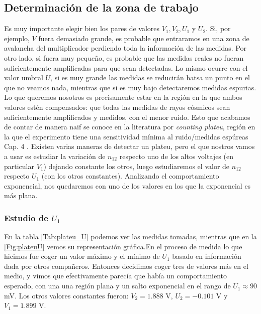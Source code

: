 \documentclass[11pt]{article}
\begin{document}
\subsection{Determinación de la zona de trabajo} \label{Subsec:zona_trabajo}

Es muy importante elegir bien los pares de valores $V_1,V_2,U_1$ y $U_2$. Si, por ejemplo, $V$ fuera demasiado grande, es probable que entraramos en una zona de avalancha del multiplicador perdiendo toda la información de las medidas. Por otro lado, si fuera muy pequeño, es probable que las medidas reales no fueran suficientemente amplificadas para que sean detectadas. Lo mismo ocurre con el valor umbral $U$, si es muy grande las medidas se reducirán hatsa un punto en el que no veamos nada, mientras que si es muy bajo detectaremos medidas espurias. Lo que queremos nosotros es precisamente estar en la región en la que ambos valores estén compensados: que todas las medidas de rayos cósmicos sean suficientemente amplificados y medidos, con el menor ruido. Esto que acabamos de contar de manera naif se conoce en la literatura por \textit{counting plateu}, región en la que el experimento tiene una sensitividad mínima al ruido/medidas espúreas Cap. 4 \cite{Knoll:1300754}. Existen varias maneras de detectar un plateu, pero el que nostros vamos a usar es estudiar la variación de $n_{12}$ respecto uno de los altos voltajes (en particular $V_1$) dejando constante los otros, luego estudiaremos el valor de $n_{12}$ respecto $U_1$ (con los otros constantes). Analizando el comportamiento exponencial, nos quedaremos con uno de los valores en los que la exponencial es más plana.


\subsubsection{Estudio de $U_1$}


En la tabla \ref{Tab:plateu_U} podemos ver las medidas tomadas, mientras que en la \cref{Fig:plateuU} vemos su representación gráfica.En el proceso de medida lo que hicimos fue coger un valor máximo  y el mínimo de $U_1$ basado en información dada por otros compañeros. Entonces decidimos coger tres de valores más en el medio, y vimos que efectivamente parecía que había un comportamiento esperado, con una una región plana y un salto exponencial en el rango de $U_1\approx 90$ mV. Los otros valores constantes fueron: $V_2=1.888$ V, $U_2=-0.101$ V y $V_1=1.899$ V.
\end{document}

